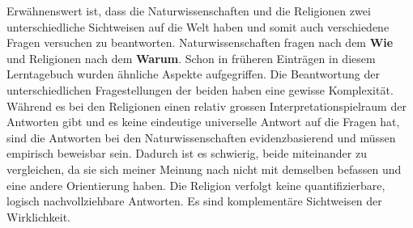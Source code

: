 Erwähnenswert ist, dass die Naturwissenschaften und die Religionen zwei unterschiedliche Sichtweisen auf die Welt haben und somit auch verschiedene Fragen versuchen zu beantworten. Naturwissenschaften fragen nach dem \textbf{Wie} und Religionen nach dem \textbf{Warum}. Schon in früheren Einträgen in diesem Lerntagebuch wurden ähnliche Aspekte aufgegriffen. Die Beantwortung der unterschiedlichen Fragestellungen der beiden haben eine gewisse Komplexität. Während es bei den Religionen einen relativ grossen Interpretationspielraum der Antworten gibt und es keine eindeutige universelle Antwort auf die Fragen hat, sind die Antworten bei den Naturwissenschaften evidenzbasierend und müssen empirisch beweisbar sein. Dadurch ist es schwierig, beide miteinander zu vergleichen, da sie sich meiner Meinung nach nicht mit demselben befassen und eine andere Orientierung haben. Die Religion verfolgt keine quantifizierbare, logisch nachvollziehbare Antworten. Es sind komplementäre Sichtweisen der Wirklichkeit.